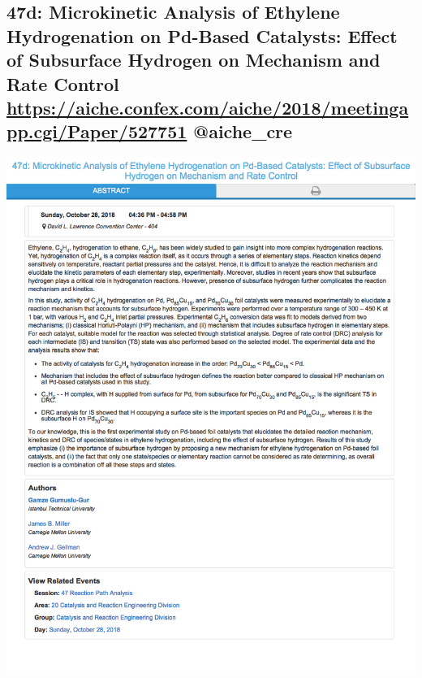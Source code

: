 \documentclass[11pt]{article}
\begin{document}
\subsection{47d: Microkinetic Analysis of Ethylene Hydrogenation on Pd-Based Catalysts: Effect of Subsurface Hydrogen on Mechanism and Rate Control \url{https://aiche.confex.com/aiche/2018/meetingapp.cgi/Paper/527751} @aiche\_cre}
\label{sec:org5f38df4}
\begin{center}
\includegraphics[width=.9\linewidth]{./527751.png}
\end{center}
\end{document}
